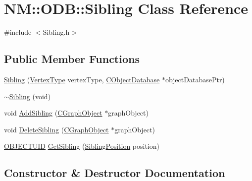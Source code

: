 \hypertarget{class_n_m_1_1_o_d_b_1_1_sibling}{}\section{N\+M\+:\+:O\+D\+B\+:\+:Sibling Class Reference}
\label{class_n_m_1_1_o_d_b_1_1_sibling}


{\ttfamily \#include $<$Sibling.\+h$>$}

\subsection*{Public Member Functions}
\begin{DoxyCompactItemize}
\item 
\hyperlink{class_n_m_1_1_o_d_b_1_1_sibling_a8e1dd2129154963690b293a95a4edc8c}{Sibling} (\hyperlink{namespace_n_m_1_1_o_d_b_a74e0c94daaeea6f7e783c03a8c921022}{Vertex\+Type} vertex\+Type, \hyperlink{class_n_m_1_1_o_d_b_1_1_c_object_database}{C\+Object\+Database} $\ast$object\+Database\+Ptr)
\item 
\hyperlink{class_n_m_1_1_o_d_b_1_1_sibling_a58c3098a6404d7579457d7250e5bde17}{$\sim$\+Sibling} (void)
\item 
void \hyperlink{class_n_m_1_1_o_d_b_1_1_sibling_acd3e3b9e232b13b70416cda63e8e2d02}{Add\+Sibling} (\hyperlink{class_n_m_1_1_o_d_b_1_1_c_graph_object}{C\+Graph\+Object} $\ast$graph\+Object)
\item 
void \hyperlink{class_n_m_1_1_o_d_b_1_1_sibling_a672ba157483b838ede7c98b3718ed49d}{Delete\+Sibling} (\hyperlink{class_n_m_1_1_o_d_b_1_1_c_graph_object}{C\+Graph\+Object} $\ast$graph\+Object)
\item 
\hyperlink{namespace_n_m_1_1_o_d_b_a262b64fab56baaa96e18bac4ada88265}{O\+B\+J\+E\+C\+T\+U\+I\+D} \hyperlink{class_n_m_1_1_o_d_b_1_1_sibling_a6810fdb47161d77e2b1945933a40178f}{Get\+Sibling} (\hyperlink{namespace_n_m_1_1_o_d_b_a1b474aa7e937112cda42381969dcb55e}{Sibling\+Position} position)
\end{DoxyCompactItemize}


\subsection{Constructor \& Destructor Documentation}
\hypertarget{class_n_m_1_1_o_d_b_1_1_sibling_a8e1dd2129154963690b293a95a4edc8c}{}
